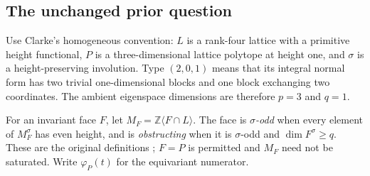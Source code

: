 \documentclass[11pt,a4paper]{article}
\theoremstyle{definition}\newtheorem{definition}[lemma]{Definition}
\theoremstyle{remark}\newtheorem{remark}[lemma]{Remark}
\begin{document}
\subsection{The unchanged prior question}

Use Clarke's homogeneous convention: $L$ is a rank-four lattice with a
primitive height functional, $P$ is a three-dimensional lattice polytope
at height one, and $\sigma$ is a height-preserving involution.
Type $(2,0,1)$ means that its integral normal form has two trivial
one-dimensional blocks and one block exchanging two coordinates. The
ambient eigenspace dimensions are therefore $p=3$ and $q=1$.

For an invariant face $F$, let
$M_F=\mathbb Z\langle F\cap L\rangle$. The face is \emph{$\sigma$-odd}
when every element of $M_F^\sigma$ has even height, and is
\emph{obstructing} when it is $\sigma$-odd and
$\dim F^\sigma\geq q$. These are the original definitions
\cite[Definition~4.1]{Clarke26}; $F=P$ is permitted and $M_F$ need not be
saturated. Write $\varphi_P(t)$ for the equivariant numerator.
\end{document}
